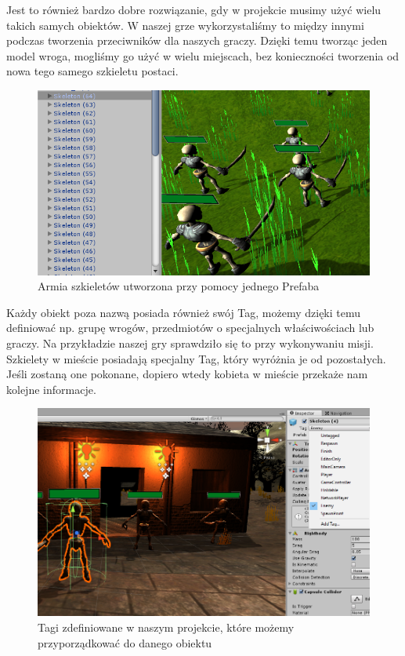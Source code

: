 \documentclass[openright]{xmgr}
\begin{document}
    Jest to również bardzo dobre rozwiązanie, gdy w projekcie musimy użyć wielu takich samych obiektów. W naszej grze wykorzystaliśmy to między innymi podczas tworzenia przeciwników dla naszych graczy. Dzięki temu tworząc jeden model wroga, mogliśmy go użyć w wielu miejscach, bez konieczności tworzenia od nowa tego samego szkieletu postaci.

    \begin{figure}[H]
      \center
      \includegraphics[width=\textwidth]{prefab2.png}
      \caption{Armia szkieletów utworzona przy pomocy jednego Prefaba}
    \end{figure}

    Każdy obiekt poza nazwą posiada również swój Tag, możemy dzięki temu definiować np. grupę wrogów, przedmiotów o specjalnych właściwościach lub graczy. Na przykładzie naszej gry sprawdziło się to przy wykonywaniu misji. Szkielety w mieście posiadają specjalny Tag, który wyróżnia je od pozostałych. Jeśli zostaną one pokonane, dopiero wtedy kobieta w mieście przekaże nam kolejne informacje.

    \begin{figure}[H]
      \center
      \includegraphics[width=\textwidth]{Tag.png}
      \caption{Tagi zdefiniowane w naszym projekcie, które możemy przyporządkować do danego obiektu}
    \end{figure}
\end{document}
